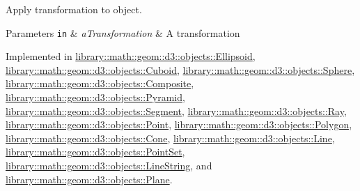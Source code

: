 Apply transformation to object. 


\begin{DoxyParams}[1]{Parameters}
\mbox{\tt in}  & {\em a\+Transformation} & A transformation \\
\hline
\end{DoxyParams}


Implemented in \hyperlink{classlibrary_1_1math_1_1geom_1_1d3_1_1objects_1_1_ellipsoid_a101408b676b518c0270ebabc55f288d2}{library\+::math\+::geom\+::d3\+::objects\+::\+Ellipsoid}, \hyperlink{classlibrary_1_1math_1_1geom_1_1d3_1_1objects_1_1_cuboid_a97a3057434b7c90891a5bdb1cd4b907c}{library\+::math\+::geom\+::d3\+::objects\+::\+Cuboid}, \hyperlink{classlibrary_1_1math_1_1geom_1_1d3_1_1objects_1_1_sphere_acb4ca3f037791f9f71bffc904a1bf961}{library\+::math\+::geom\+::d3\+::objects\+::\+Sphere}, \hyperlink{classlibrary_1_1math_1_1geom_1_1d3_1_1objects_1_1_composite_a607850ccaeaea1dcd0cc57f986bea243}{library\+::math\+::geom\+::d3\+::objects\+::\+Composite}, \hyperlink{classlibrary_1_1math_1_1geom_1_1d3_1_1objects_1_1_pyramid_a79d9b11e42c47213e2eb9538e52a2103}{library\+::math\+::geom\+::d3\+::objects\+::\+Pyramid}, \hyperlink{classlibrary_1_1math_1_1geom_1_1d3_1_1objects_1_1_segment_a63c7017391bcc0e67f4d97311e7ebdb2}{library\+::math\+::geom\+::d3\+::objects\+::\+Segment}, \hyperlink{classlibrary_1_1math_1_1geom_1_1d3_1_1objects_1_1_ray_a0dd177a924978e1817a9fa888594e694}{library\+::math\+::geom\+::d3\+::objects\+::\+Ray}, \hyperlink{classlibrary_1_1math_1_1geom_1_1d3_1_1objects_1_1_point_ad2052f6ef5df88b75cae09c58a678f95}{library\+::math\+::geom\+::d3\+::objects\+::\+Point}, \hyperlink{classlibrary_1_1math_1_1geom_1_1d3_1_1objects_1_1_polygon_a712a6f0b739c0f92f3c64873482da217}{library\+::math\+::geom\+::d3\+::objects\+::\+Polygon}, \hyperlink{classlibrary_1_1math_1_1geom_1_1d3_1_1objects_1_1_cone_a838ecaabc29abd32666342a7582a4a3e}{library\+::math\+::geom\+::d3\+::objects\+::\+Cone}, \hyperlink{classlibrary_1_1math_1_1geom_1_1d3_1_1objects_1_1_line_ae485ab541cbd10113eac30d1956fb4c0}{library\+::math\+::geom\+::d3\+::objects\+::\+Line}, \hyperlink{classlibrary_1_1math_1_1geom_1_1d3_1_1objects_1_1_point_set_aa747a6169cd9c14011c8249a728c3c48}{library\+::math\+::geom\+::d3\+::objects\+::\+Point\+Set}, \hyperlink{classlibrary_1_1math_1_1geom_1_1d3_1_1objects_1_1_line_string_a8a20f45b2af9cc45dbf7aff9e5d4824e}{library\+::math\+::geom\+::d3\+::objects\+::\+Line\+String}, and \hyperlink{classlibrary_1_1math_1_1geom_1_1d3_1_1objects_1_1_plane_ab3474aef2e9f8dd4f9e86da017522487}{library\+::math\+::geom\+::d3\+::objects\+::\+Plane}.

